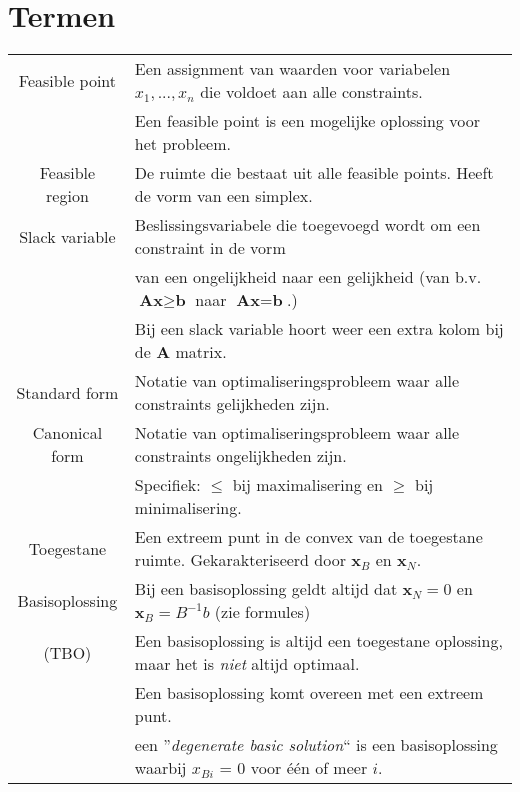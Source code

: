\documentclass[10pt,a4paper]{article}
\begin{document}
\section*{Termen}
\begin{tabular}{|c|l|}
\hline
Feasible point & Een assignment van waarden voor variabelen $x_1, ..., x_n$ die voldoet aan alle constraints. \\ 
& Een feasible point is een mogelijke oplossing voor het probleem.\\
\hline
Feasible region & De ruimte die bestaat uit alle feasible points. Heeft de vorm van een simplex. \\
\hline
Slack variable & Beslissingsvariabele die toegevoegd wordt om een constraint in de vorm \\ &van een ongelijkheid naar een gelijkheid (van b.v. $\textbf{Ax} \geq \textbf{b}$ naar $\textbf{Ax} = \textbf{b}$.)\\
& Bij een slack variable hoort weer een extra kolom bij de $\textbf{A}$ matrix. \\
\hline
Standard form & Notatie van optimaliseringsprobleem waar alle constraints gelijkheden zijn.\\
\hline
Canonical form & Notatie van optimaliseringsprobleem waar alle constraints ongelijkheden zijn.\\
 & Specifiek: $\le$ bij maximalisering en $\geq$ bij minimalisering. \\
\hline
Toegestane & Een extreem punt in de convex van de toegestane ruimte. Gekarakteriseerd door $\textbf{x}_B$ en $\textbf{x}_N$. \\
Basisoplossing & Bij een basisoplossing geldt altijd dat $\textbf{x}_N = 0$ en $\textbf{x}_B = B^{-1}b$ (zie formules) \\
(TBO) & Een basisoplossing is altijd een toegestane oplossing, maar het is \textit{niet} altijd optimaal. \\
 & Een basisoplossing komt overeen met een extreem punt. \\
 & een ''\textit{degenerate basic solution}`` is een basisoplossing waarbij $x_{Bi}$ = 0 voor één of meer $i$. \\
\hline
\end{tabular} 
\end{document}
